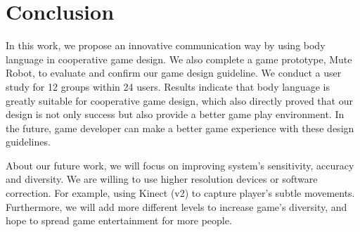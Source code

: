 \documentclass{sigchi}
\begin{document}

\section{Conclusion}

In this work, we propose an innovative communication way by using body language in cooperative game design. We also complete a game prototype, Mute Robot, to evaluate and confirm our game design guideline. We conduct a user study for 12 groups within 24 users. Results indicate that body language is greatly suitable for cooperative game design, which also directly proved that our design is not only success but also provide a better game play environment. In the future, game developer can make a better game experience with these design guidelines. 

About our future work, we will focus on improving system's sensitivity, accuracy and diversity. We are willing to use higher resolution devices or software correction. For example, using Kinect (v2) to capture player's subtle movements. Furthermore, 
we will add more different levels to increase game's diversity, and hope to spread game entertainment for more people.

\balance




\end{document}

